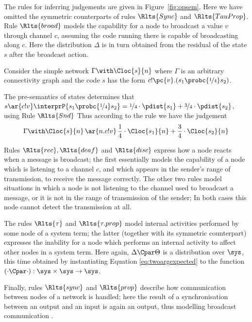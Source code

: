 \documentclass{LMCS}
\begin{document}
\noindent The rules for inferring judgements are given in
Figure~\ref{fig:opsem}. Here we have omitted the 
symmetric counterparts of rules $\Rlts{Sync}$ and 
$\Rlts{TauProp}$.
Rule $\Rlts{broad}$ models the capability for a node to broadcast a value $v$ through 
channel $c$, assuming the code running there
is capable of broadcasting along $c$. 
Here the distribution $\Delta$ is in turn obtained from the residual of the state $s$ after the broadcast action. 
\begin{exa}
  Consider the simple network $\Gamma \with \Cloc{s}{n}$ where $\Gamma$ is 
  an arbitrary connectivity graph and the code $s$ has the form 
$c!\pc{v}. (s_1 \probc{\nicefrac{1}{4}} s_2)$. 

The pre-semantics of states determines that $s \ar{c!v} 
\interprP{s_1 \probc{\nicefrac{1}{4}} s_2} = \nicefrac{1}{4} \cdot \pdist{s_1} + \nicefrac{3}{4} \cdot \pdist{s_2}$, 
using Rule $\Rlts{Snd}$
Thus according to the rule  
 we have the judgement
\begin{align*}
  \Gamma \with \Cloc{s}{n}  \,\ar{n.c!v}\,  \frac{1}{4} \cdot  \Cloc{s_1}{n}  + \frac{3}{4} \cdot \Cloc{s_2}{n}
\end{align*}
\end{exa}\vspace{6 pt}

\noindent Rules $\Rlts{rec}, \Rlts{deaf}$ and $\Rlts{disc}$ express how a node reacts 
when a message is broadcast; the first essentially models the capability of a node which is 
listening to a channel $c$, and which appears in the sender's range of transmission, 
to receive the message correctly. The other two rules model situations in which a node is 
not listening to the channel used to broadcast a message, or it is not in the range of transmission of the sender;
 In both cases this node cannot detect the transmission at all.

The rules $\Rlts{\tau}$ and $\Rlts{\tau.prop}$ model internal activities performed 
by some node of a system term; the latter (together with its symmetric 
counterpart) expresses the inability for a node which 
performs an internal activity to affect other nodes in a system term. Here again, $\Delta \Cpar \Theta$ 
is a distribution over $\sys$, this time obtained by instantiating Equation \eqref{eq:twoargexpected} to 
the function $(\cdot \Cpar \cdot) : \sys \times \sys \rightarrow \sys$.

Finally, rules $\Rlts{sync}$ and $\Rlts{prop}$ describe how communication 
between nodes of a network is handled; here the result of a synchronisation between 
an output and an input is again an output, thus modelling broadcast 
communication \cite{Prasad95}.
\end{document}

